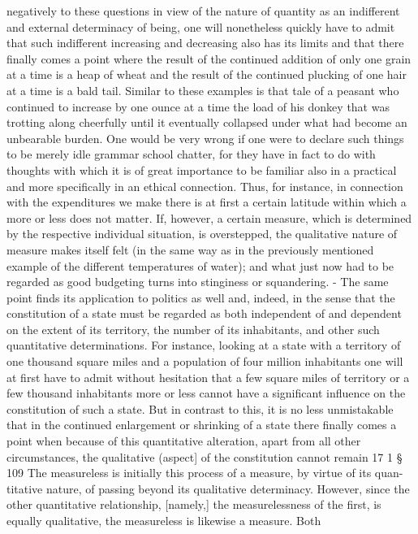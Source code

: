 {{negatively to these questions in view of the nature of quantity as an indifferent
and external determinacy of being, one will nonetheless quickly have to admit that
such indifferent increasing and decreasing also has its limits and that there finally
comes a point where the result of the continued addition of only one grain at a
time is a heap of wheat and the result of the continued plucking of one hair at a
time is a bald tail. Similar to these examples is that tale of a peasant who continued
to increase by one ounce at a time the load of his donkey that was trotting along
cheerfully until it eventually collapsed under what had become an unbearable
burden. One would be very wrong if one were to declare such things to be merely
idle grammar school chatter, for they have in fact to do with thoughts with which
it is of great importance to be familiar also in a practical and more specifically in
an ethical connection. Thus, for instance, in connection with the expenditures we
make there is at first a certain latitude within which a more or less does not matter.
If, however, a certain measure, which is determined by the respective individual
situation, is overstepped, the qualitative nature of measure makes itself felt (in the
same way as in the previously mentioned example of the different temperatures
of water); and what just now had to be regarded as good budgeting turns into
stinginess or squandering. - The same point finds its application to politics as
well and, indeed, in the sense that the constitution of a state must be regarded as
both independent of and dependent on the extent of its territory, the number of
its inhabitants, and other such quantitative determinations. For instance, looking
at a state with a territory of one thousand square miles and a population of four
million inhabitants one will at first have to admit without hesitation that a few
square miles of territory or a few thousand inhabitants more or less cannot have a
significant influence on the constitution of such a state. But in contrast to this, it
is no less unmistakable that in the continued enlargement or shrinking of a state
there finally comes a point when because of this quantitative alteration, apart from
all other circumstances, the qualitative (aspect] of the constitution cannot remain
17 1
§ 109
The measureless is initially this process of a measure, by virtue of its quan-
titative nature, of passing beyond its qualitative determinacy. However,
since the other quantitative relationship, [namely,] the measurelessness of
the first, is equally qualitative, the measureless is likewise a measure. Both
}}
